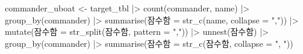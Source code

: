 \documentclass[
  letterpaper,
  chapter,a4paper,showtrims,openright,hidelinks]{oblivoir}
\newenvironment{Shaded}{\begin{snugshade}}{\end{snugshade}}
\newcommand{\AttributeTok}[1]{\textcolor[rgb]{0.40,0.45,0.13}{#1}}
\newcommand{\FunctionTok}[1]{\textcolor[rgb]{0.28,0.35,0.67}{#1}}
\newcommand{\NormalTok}[1]{\textcolor[rgb]{0.00,0.23,0.31}{#1}}
\newcommand{\OtherTok}[1]{\textcolor[rgb]{0.00,0.23,0.31}{#1}}
\newcommand{\SpecialCharTok}[1]{\textcolor[rgb]{0.37,0.37,0.37}{#1}}
\newcommand{\StringTok}[1]{\textcolor[rgb]{0.13,0.47,0.30}{#1}}
\begin{document}
\begin{Shaded}
\begin{Highlighting}[]
\NormalTok{commander\_uboat }\OtherTok{\textless{}{-}}\NormalTok{ target\_tbl }\SpecialCharTok{|\textgreater{}} 
  \FunctionTok{count}\NormalTok{(commander, name) }\SpecialCharTok{|\textgreater{}} 
  \FunctionTok{group\_by}\NormalTok{(commander) }\SpecialCharTok{|\textgreater{}} 
  \FunctionTok{summarise}\NormalTok{(잠수함 }\OtherTok{=} \FunctionTok{str\_c}\NormalTok{(name, }\AttributeTok{collapse =} \StringTok{","}\NormalTok{)) }\SpecialCharTok{|\textgreater{}} 
  \FunctionTok{mutate}\NormalTok{(잠수함 }\OtherTok{=} \FunctionTok{str\_split}\NormalTok{(잠수함, }\AttributeTok{pattern =} \StringTok{","}\NormalTok{)) }\SpecialCharTok{|\textgreater{}} 
  \FunctionTok{unnest}\NormalTok{(잠수함) }\SpecialCharTok{|\textgreater{}} 
  \FunctionTok{group\_by}\NormalTok{(commander) }\SpecialCharTok{|\textgreater{}} 
  \FunctionTok{summarise}\NormalTok{(잠수함 }\OtherTok{=} \FunctionTok{str\_c}\NormalTok{(잠수함, }\AttributeTok{collapse =} \StringTok{", "}\NormalTok{))}


\end{Highlighting}
\end{Shaded}
\end{document}
